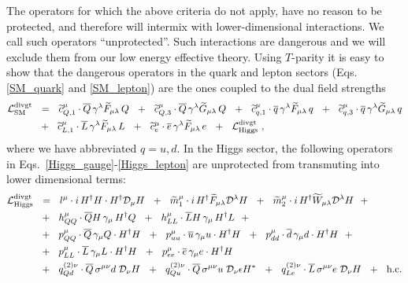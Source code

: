 \documentclass[12pt,preprintnumbers,nofootinbib]{revtex4}
\newcommand{\wt}{\widetilde}
\newcommand{\ov}{\overline}
\newcommand{\md}{\mathcal{D}}
\begin{document}
	The operators for which the above criteria do not apply, have no reason to be protected,
	and therefore will intermix with lower-dimensional interactions. 
	We call such operators ``unprotected''. 
%
	Such interactions are dangerous and we will exclude them from our low energy effective theory. 
	Using $T$-parity it is easy to show that the dangerous operators
	in the quark and lepton sectors (Eqs. \eqref{SM_quark} and \eqref{SM_lepton}) 
	are the ones coupled to the dual field strengths
\begin{align}
\label{SM_divgt}
\notag
	\mathcal{L}_{\rm SM}^{\rm divgt} & ~~=~~
	\wt{c}_{Q,1}^\mu \cdot
	\ov{Q}\, \gamma^\lambda \wt{F}_{\mu\lambda}\, Q 
	~~+~~
	\wt{c}_{Q,3}^\mu \cdot
	\ov{Q}\, \gamma^\lambda \wt{G}_{\mu\lambda}\, Q 
	~~+~~
	\wt{c}_{q,1}^\mu \cdot
	\ov{q}\, \gamma^\lambda \wt{F}_{\mu\lambda}\, q
	~~+~~ 
	\wt{c}_{q,3}^\mu \cdot
	\ov{q}\, \gamma^\lambda \wt{G}_{\mu\lambda}\, q
	\\
	&
	~~+~~ 
	\wt{c}_{L,1}^\mu \cdot
	\ov{L}\, \gamma^{\lambda} \wt{F}_{\mu\lambda}\, L
	~~+~~
	\wt{c}_{e}^\mu \cdot
	\ov{e}\, \gamma^{\lambda} \wt{F}_{\mu\lambda}\, e
	~~+~~
	\mathcal{L}_{\rm Higgs}^{\rm divgt}~,
\end{align}
	where we have abbreviated $ q = u, d $.
	In the Higgs sector, the following operators in 
	Eqs.~\eqref{Higgs_gauge}-\eqref{Higgs_lepton} are unprotected from 
	transmuting into lower dimensional terms:
\begin{align}
\notag
	\mathcal{L}_{\rm Higgs}^{\rm divgt} ~~&=~~
	l^\mu \cdot
	i\, 
	H^\dag H \cdot H^\dag \md_\mu H
	~~+~~
	\wt{m}^\mu_1 \cdot
	i\, 
	H^\dag \wt{F}_{\mu\lambda} \md^\lambda H
	~~+~~
	\wt{m}^\mu_2 \cdot
	i\, 
	H^\dag \wt{W}_{\mu\lambda} \md^\lambda H
	~~+~~
\\
\notag
	& 
	+~~
	h^{\mu}_{QQ} \cdot
	\ov{Q}H \, \gamma_\mu\, H^\dag Q ~~+~~
	h^{\mu}_{LL} \cdot
	\ov{L}H \, \gamma_\mu\, H^\dag L ~~+~~
\\
\label{Higgs_divgt}
	&
	+~~
	p_{QQ}^\mu \cdot
	\ov{Q}\, \gamma_\mu Q \cdot H^\dag H ~~+~~
	p_{uu}^\mu \cdot
	\ov{u}\, \gamma_\mu u \cdot H^\dag H ~~+~~
	p_{dd}^\mu \cdot
	\ov{d}\, \gamma_\mu d \cdot H^\dag H 
	~~+~~
	\\
\notag
	&
	+~~
	p_{LL}^\mu \cdot
	\ov{L}\, \gamma_\mu L \cdot H^\dag H ~~+~~
	p_{ee}^\mu \cdot
	\ov{e}\, \gamma_\mu e \cdot H^\dag H 
	\\
\notag
	&
	+~~
	q^{(2)\nu}_{Qd} \cdot
	\ov{Q}\, \sigma^{\mu\nu} d\; \md_\nu H ~~+~~
	q^{(2)\nu}_{Qu} \cdot
	\ov{Q}\, \sigma^{\mu\nu} u\; \md_\nu \epsilon H^* ~~+~~
	q^{(2)\nu}_{Le} \cdot
	\ov{L}\, \sigma^{\mu\nu} e\; \md_\nu H ~~+~~
	\text{h.c.}
\end{align}
\end{document}
